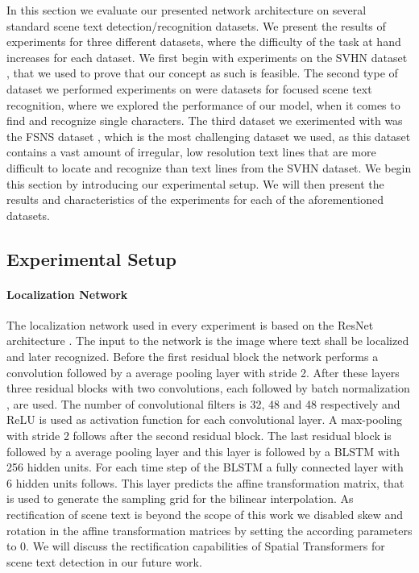 \documentclass[10pt,twocolumn,letterpaper]{article}
\begin{document}
In this section we evaluate our presented network architecture on several standard scene text detection/recognition datasets.
We present the results of experiments for three different datasets, where the difficulty of the task at hand increases for each dataset.
We first begin with experiments on the SVHN dataset \cite{Netzer2011Reading}, that we used to prove that our concept as such is feasible.
The second type of dataset we performed experiments on were datasets for focused scene text recognition, where we explored the performance of our model, when it comes to find and recognize single characters.
The third dataset we exerimented with was the \acf{FSNS} dataset \cite{Smith2016EndToEnd}, which is the most challenging dataset we used, as this dataset contains a vast amount of irregular, low resolution text lines that are more difficult to locate and recognize than text lines from the SVHN dataset.
We begin this section by introducing our experimental setup.
We will then present the results and characteristics of the experiments for each of the aforementioned datasets.

\subsection{Experimental Setup}
\label{ssec:experimental_setup}

\paragraph{Localization Network}
The localization network used in every experiment is based on the ResNet architecture \cite{He2016Deep}.
The input to the network is the image where text shall be localized and later recognized.
Before the first residual block the network performs a  convolution followed by a  average pooling layer with stride 2.
After these layers three residual blocks with two  convolutions, each followed by batch normalization \cite{Ioffe2015Batcha}, are used.
The number of convolutional filters is 32, 48 and 48 respectively and ReLU \cite{Nair2010Rectified} is used as activation function for each convolutional layer.
A  max-pooling with stride 2 follows after the second residual block.
The last residual block is followed by a  average pooling layer and this layer is followed by a \ac{BLSTM} with 256 hidden units.
For each time step of the \ac{BLSTM} a fully connected layer with 6 hidden units follows.
This layer predicts the affine transformation matrix, that is used to generate the sampling grid for the bilinear interpolation.
As rectification of scene text is beyond the scope of this work we disabled skew and rotation in the affine transformation matrices by setting the according parameters to 0.
We will discuss the rectification capabilities of Spatial Transformers for scene text detection in our future work.
\end{document}
